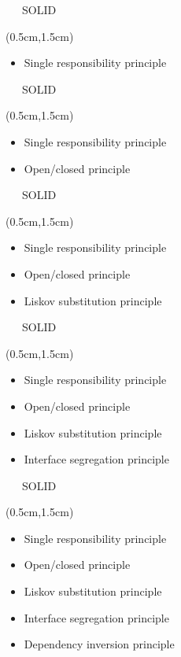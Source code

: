\documentclass[xetex,18pt,aspectratio=43]{beamer}
\begin{document}
\begin{Large}
\begin{frame}{\ \ \ SOLID}
\begin{textblock*}{\framewidth-0.8cm}(0.5cm,1.5cm)
\begin{itemize}
  \item Single responsibility principle
\end{itemize}
\end{textblock*}
\end{frame}

\begin{frame}{\ \ \ SOLID}
\begin{textblock*}{\framewidth-0.8cm}(0.5cm,1.5cm)
\begin{itemize}
  \item Single responsibility principle
  \item Open/closed principle
\end{itemize}
\end{textblock*}
\end{frame}

\begin{frame}{\ \ \ SOLID}
\begin{textblock*}{\framewidth-0.8cm}(0.5cm,1.5cm)
\begin{itemize}
  \item Single responsibility principle
  \item Open/closed principle
  \item Liskov substitution principle
\end{itemize}
\end{textblock*}
\end{frame}

\begin{frame}{\ \ \ SOLID}
\begin{textblock*}{\framewidth-0.8cm}(0.5cm,1.5cm)
\begin{itemize}
  \item Single responsibility principle
  \item Open/closed principle
  \item Liskov substitution principle
  \item Interface segregation principle
\end{itemize}
\end{textblock*}
\end{frame}

\begin{frame}{\ \ \ SOLID}
\begin{textblock*}{\framewidth-0.8cm}(0.5cm,1.5cm)
\begin{itemize}
  \item Single responsibility principle
  \item Open/closed principle
  \item Liskov substitution principle
  \item Interface segregation principle
  \item Dependency inversion principle
\end{itemize}
\end{textblock*}
\end{frame}


\end{Large}
\end{document}
